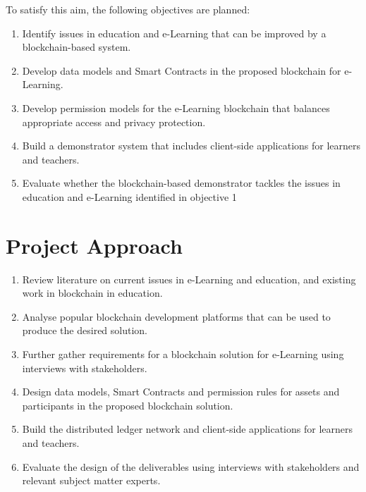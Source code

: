 To satisfy this aim, the following objectives are planned:

\begin{enumerate}
	\setlength\itemsep{0em}    
    \item Identify issues in education and e-Learning that can be improved by a blockchain-based system.
    \item Develop data models and Smart Contracts in the proposed blockchain for e-Learning.
    \item Develop permission models for the e-Learning blockchain that balances appropriate access and privacy protection.
    \item Build a demonstrator system that includes client-side applications for learners and teachers.
    \item Evaluate whether the blockchain-based demonstrator tackles the issues in education and e-Learning identified in objective 1
\end{enumerate}


\section{Project Approach} %

\begin{enumerate}
	\setlength\itemsep{0em}    
    \item Review literature on current issues in e-Learning and education, and existing work in blockchain in education.
    \item Analyse popular blockchain development platforms that can be used to produce the desired solution.
    \item Further gather requirements for a blockchain solution for e-Learning using interviews with stakeholders.
    \item Design data models, Smart Contracts and permission rules for assets and participants in the proposed blockchain solution.
    \item Build the distributed ledger network and client-side applications for learners and teachers.
    \item Evaluate the design of the deliverables using interviews with stakeholders and relevant subject matter experts.
\end{enumerate}

